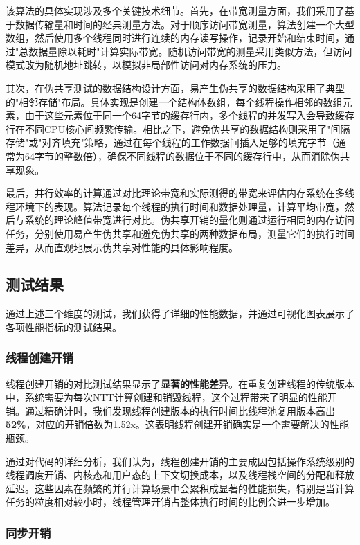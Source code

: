 \documentclass[a4paper]{article}
\begin{document}
该算法的具体实现涉及多个关键技术细节。首先，在带宽测量方面，我们采用了基于数据传输量和时间的经典测量方法。对于顺序访问带宽测量，算法创建一个大型数组，然后使用多个线程同时进行连续的内存读写操作，记录开始和结束时间，通过"总数据量除以耗时"计算实际带宽。随机访问带宽的测量采用类似方法，但访问模式改为随机地址跳转，以模拟非局部性访问对内存系统的压力。

其次，在伪共享测试的数据结构设计方面，易产生伪共享的数据结构采用了典型的"相邻存储"布局。具体实现是创建一个结构体数组，每个线程操作相邻的数组元素，由于这些元素位于同一个64字节的缓存行内，多个线程的并发写入会导致缓存行在不同CPU核心间频繁传输。相比之下，避免伪共享的数据结构则采用了"间隔存储"或"对齐填充"策略，通过在每个线程的工作数据间插入足够的填充字节（通常为64字节的整数倍），确保不同线程的数据位于不同的缓存行中，从而消除伪共享现象。

最后，并行效率的计算通过对比理论带宽和实际测得的带宽来评估内存系统在多线程环境下的表现。算法记录每个线程的执行时间和数据处理量，计算平均带宽，然后与系统的理论峰值带宽进行对比。伪共享开销的量化则通过运行相同的内存访问任务，分别使用易产生伪共享和避免伪共享的两种数据布局，测量它们的执行时间差异，从而直观地展示伪共享对性能的具体影响程度。

\subsection{测试结果}

通过上述三个维度的测试，我们获得了详细的性能数据，并通过可视化图表展示了各项性能指标的测试结果。

\subsubsection{线程创建开销}

线程创建开销的对比测试结果显示了\textbf{显著的性能差异}。在重复创建线程的传统版本中，系统需要为每次NTT计算创建和销毁线程，这个过程带来了明显的性能开销。通过精确计时，我们发现线程创建版本的执行时间比线程池复用版本高出\textbf{52\%}，对应的开销倍数为1.52x。这表明线程创建开销确实是一个需要解决的性能瓶颈。

通过对代码的详细分析，我们认为，线程创建开销的主要成因包括操作系统级别的线程调度开销、内核态和用户态的上下文切换成本，以及线程栈空间的分配和释放延迟。这些因素在频繁的并行计算场景中会累积成显著的性能损失，特别是当计算任务的粒度相对较小时，线程管理开销占整体执行时间的比例会进一步增加。

\subsubsection{同步开销}
\end{document}
